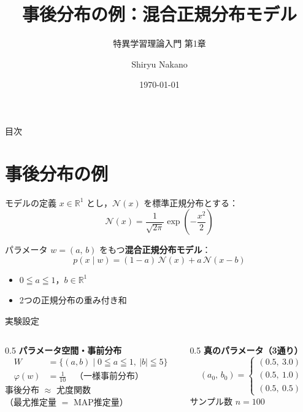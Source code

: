 \documentclass[aspectratio=169,11pt]{beamer}
\title{事後分布の例：混合正規分布モデル}
\subtitle{特異学習理論入門 第1章}
\author{Shiryu Nakano}
\date{\today}
\begin{document}
\frame{\titlepage}

\begin{frame}{目次}
  \tableofcontents
\end{frame}

\section{事後分布の例}

\begin{frame}{モデルの定義}
  $x \in \mathbb{R}^1$ とし，$\mathcal{N}(x)$ を標準正規分布とする：
  \begin{equation*}
    \mathcal{N}(x) = \frac{1}{\sqrt{2\pi}} \exp\!\left(-\frac{x^2}{2}\right)
  \end{equation*}

  パラメータ $w = (a,\, b)$ をもつ\textbf{混合正規分布モデル}：
  \begin{equation*}
    p(x \mid w) = (1-a)\,\mathcal{N}(x) + a\,\mathcal{N}(x - b)
  \end{equation*}

  \begin{itemize}
    \item $0 \leqq a \leqq 1$，$b \in \mathbb{R}^1$
    \item 2つの正規分布の重み付き和
  \end{itemize}
\end{frame}

\begin{frame}{実験設定}
  \begin{columns}[T]
    \begin{column}{0.5\textwidth}
      \textbf{パラメータ空間・事前分布}
      \begin{align*}
        W &= \{(a,b) \mid 0 \leqq a \leqq 1,\ |b| \leqq 5\} \\[4pt]
        \varphi(w) &= \frac{1}{10} \quad \text{（一様事前分布）}
      \end{align*}
      \vspace{0.5em}
      事後分布 $\approx$ 尤度関数\\
      （最尤推定量 $=$ MAP推定量）
    \end{column}
    \begin{column}{0.5\textwidth}
      \textbf{真のパラメータ（3通り）}
      \begin{equation*}
        (a_0,\, b_0) =
        \begin{cases}
          (0.5,\ 3.0) \\[4pt]
          (0.5,\ 1.0) \\[4pt]
          (0.5,\ 0.5)
        \end{cases}
      \end{equation*}
      \vspace{0.5em}
      サンプル数 $n = 100$
    \end{column}
  \end{columns}
\end{frame}
\end{document}
